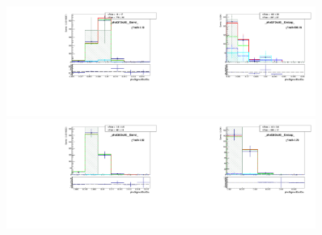 \begin{figure}[htb]
  \begin{center}
   \includegraphics[width=0.45\textwidth]{../figs/figs_v11/MUON_WGamma/TemplateFits/c_TEMPL_SIHIH_UNblind__phoEt75to85__Barrel__RooFit_MCclosure.pdf}\includegraphics[width=0.45\textwidth]{../figs/figs_v11/MUON_WGamma/TemplateFits/c_TEMPL_SIHIH_UNblind__phoEt75to85__Endcap__RooFit_MCclosure.pdf}\\
   \includegraphics[width=0.45\textwidth]{../figs/figs_v11/MUON_WGamma/TemplateFits/c_TEMPL_SIHIH_UNblind__phoEt85to95__Barrel__RooFit_MCclosure.pdf}\includegraphics[width=0.45\textwidth]{../figs/figs_v11/MUON_WGamma/TemplateFits/c_TEMPL_SIHIH_UNblind__phoEt85to95__Endcap__RooFit_MCclosure.pdf}\\

\end{center}
\end{figure}
